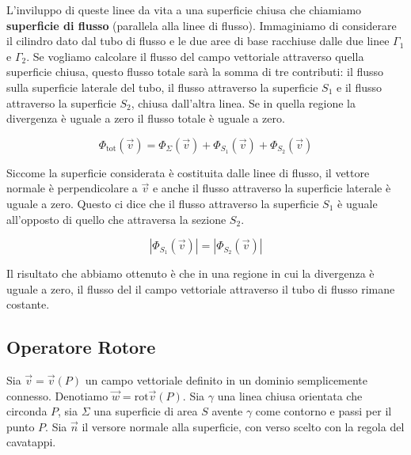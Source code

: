 L'inviluppo di queste linee da vita a una superficie chiusa che chiamiamo \textbf{superficie di flusso} (parallela alla linee di flusso).
Immaginiamo di considerare il cilindro dato dal tubo di flusso e le due aree di base racchiuse dalle due linee $\Gamma_1$ e $\Gamma_2$. Se vogliamo calcolare il flusso del campo vettoriale attraverso quella superficie chiusa, questo flusso totale sarà la somma di tre contributi: il flusso sulla superficie laterale del tubo, il flusso attraverso la superficie $S_1$ e il flusso attraverso la superficie $S_2$, chiusa dall'altra linea. Se in quella regione la divergenza è uguale a zero il flusso totale è uguale a zero.

\[
	\Phi_{\text{tot}}(\vec{v} ) = \Phi_{\Sigma}(\vec{v}) + \Phi_{S_1}(\vec{v}) + \Phi_{S_2}(\vec{v})
\]

Siccome la superficie considerata è costituita dalle linee di flusso, il vettore normale è perpendicolare a $\vec{v}$ e anche il flusso attraverso la superficie laterale è uguale a zero.
Questo ci dice che il flusso attraverso la superficie $S_1$ è uguale all'opposto di quello che attraversa la sezione $S_2$.

\[
	|\Phi_{S_1}(\vec{v})| = |\Phi_{S_2}(\vec{v})|
\]

Il risultato che abbiamo ottenuto è che in una regione in cui la divergenza è uguale a zero, il flusso del il campo vettoriale attraverso il tubo di flusso rimane costante.

\subsection{Operatore Rotore}

Sia $ \vec{v} =\vec{v} (P) $ un campo vettoriale definito in un dominio semplicemente connesso. Denotiamo $\vec{w} = \text{rot}\vec{v} (P)$.
Sia $\gamma$ una linea chiusa orientata che circonda $P$, sia $\Sigma$ una superficie di area $S$ avente $\gamma$ come contorno e passi per il punto $P$. Sia $\vec{n}$ il versore normale alla superficie, con verso scelto con la regola del cavatappi.

